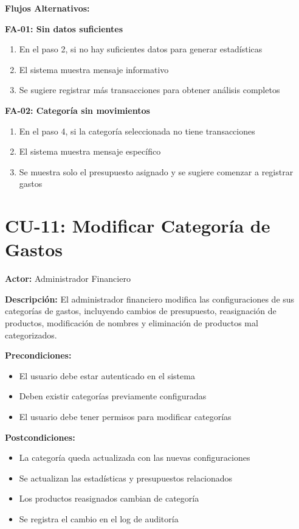 \noindent\textbf{Flujos Alternativos:}

\textbf{FA-01: Sin datos suficientes}
\begin{enumerate}
    \item En el paso 2, si no hay suficientes datos para generar estadísticas
    \item El sistema muestra mensaje informativo
    \item Se sugiere registrar más transacciones para obtener análisis completos
\end{enumerate}

\textbf{FA-02: Categoría sin movimientos}
\begin{enumerate}
    \item En el paso 4, si la categoría seleccionada no tiene transacciones
    \item El sistema muestra mensaje específico
    \item Se muestra solo el presupuesto asignado y se sugiere comenzar a registrar gastos
\end{enumerate}

\section{CU-11: Modificar Categoría de Gastos}

\noindent\textbf{Actor:} Administrador Financiero

\noindent\textbf{Descripción:} El administrador financiero modifica las configuraciones de sus categorías de gastos, incluyendo cambios de presupuesto, reasignación de productos, modificación de nombres y eliminación de productos mal categorizados.

\noindent\textbf{Precondiciones:}
\begin{itemize}
    \item El usuario debe estar autenticado en el sistema
    \item Deben existir categorías previamente configuradas
    \item El usuario debe tener permisos para modificar categorías
\end{itemize}

\noindent\textbf{Postcondiciones:}
\begin{itemize}
    \item La categoría queda actualizada con las nuevas configuraciones
    \item Se actualizan las estadísticas y presupuestos relacionados
    \item Los productos reasignados cambian de categoría
    \item Se registra el cambio en el log de auditoría
\end{itemize}

